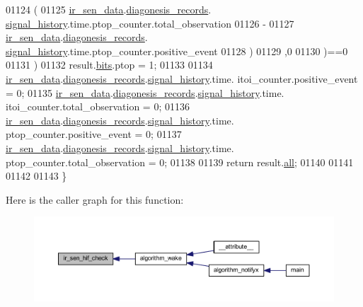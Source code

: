 \begin{DoxyCode}
01124           (
01125            \hyperlink{a00045_a73dfacb46242746440accc76c7ef710d}{ir\_sen\_data}.\hyperlink{a00023_a7ae905b560513ad201e58c2f63375030}{diagonesis\_records}.
      \hyperlink{a00017_affb63906d23cb1cb7787d61eaaedfb60}{signal\_history}.time.ptop\_counter.total\_observation
01126           -
01127            \hyperlink{a00045_a73dfacb46242746440accc76c7ef710d}{ir\_sen\_data}.\hyperlink{a00023_a7ae905b560513ad201e58c2f63375030}{diagonesis\_records}.
      \hyperlink{a00017_affb63906d23cb1cb7787d61eaaedfb60}{signal\_history}.time.ptop\_counter.positive\_event
01128           )
01129          ,0
01130           )==0
01131        )
01132         result.\hyperlink{a00021_a4c757443cba2deaf7051fd53f385a73e}{bits}.ptop = 1;
01133 
01134     \hyperlink{a00045_a73dfacb46242746440accc76c7ef710d}{ir\_sen\_data}.\hyperlink{a00023_a7ae905b560513ad201e58c2f63375030}{diagonesis\_records}.\hyperlink{a00017_affb63906d23cb1cb7787d61eaaedfb60}{signal\_history}.time.
      itoi\_counter.positive\_event      = 0;
01135     \hyperlink{a00045_a73dfacb46242746440accc76c7ef710d}{ir\_sen\_data}.\hyperlink{a00023_a7ae905b560513ad201e58c2f63375030}{diagonesis\_records}.\hyperlink{a00017_affb63906d23cb1cb7787d61eaaedfb60}{signal\_history}.time.
      itoi\_counter.total\_observation   = 0;
01136     \hyperlink{a00045_a73dfacb46242746440accc76c7ef710d}{ir\_sen\_data}.\hyperlink{a00023_a7ae905b560513ad201e58c2f63375030}{diagonesis\_records}.\hyperlink{a00017_affb63906d23cb1cb7787d61eaaedfb60}{signal\_history}.time.
      ptop\_counter.positive\_event      = 0;
01137     \hyperlink{a00045_a73dfacb46242746440accc76c7ef710d}{ir\_sen\_data}.\hyperlink{a00023_a7ae905b560513ad201e58c2f63375030}{diagonesis\_records}.\hyperlink{a00017_affb63906d23cb1cb7787d61eaaedfb60}{signal\_history}.time.
      ptop\_counter.total\_observation   = 0;
01138 
01139     \textcolor{keywordflow}{return} result.\hyperlink{a00021_a2625a533c46821f49caaf4dcc77316b1}{all};
01140 
01141 
01142 
01143 \}
\end{DoxyCode}


Here is the caller graph for this function\+:\nopagebreak
\begin{figure}[H]
\begin{center}
\leavevmode
\includegraphics[width=350pt]{d4/d51/a00017_a86870a0e00601a92277e689447739ce9_icgraph}
\end{center}
\end{figure}


